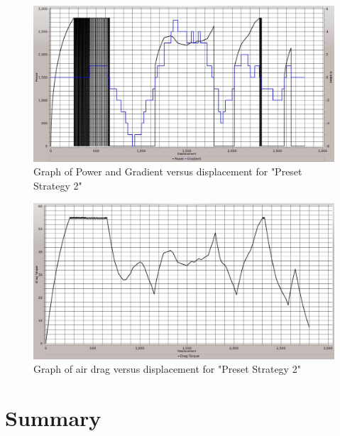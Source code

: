 \begin{figure}[htb]
	\centering
	\includegraphics[width=6in]{images/2_2.jpg}
	\caption{Graph of Power and Gradient versus displacement for "Preset Strategy 2"}
	\label{im:2_2}
\end{figure}

\begin{figure}[htb]
	\centering
	\includegraphics[width=6in]{images/2_3.jpg}
	\caption{Graph of air drag versus displacement for "Preset Strategy 2"}
	\label{im:2_3}
\end{figure}

\section{Summary}
